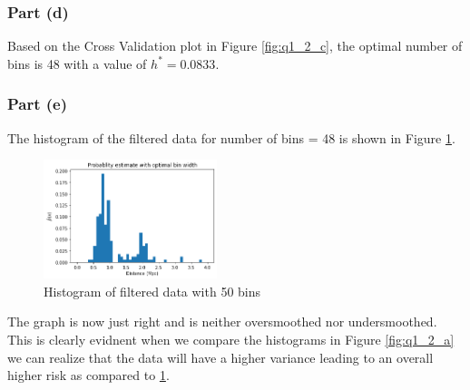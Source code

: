 \subsubsection{Part (d)}

Based on the Cross Validation plot in Figure \ref{fig:q1_2_c}, the optimal number of bins is 48 with a value of $h^\ast = 0.0833$.

\subsubsection{Part (e)}

The histogram of the filtered data for number of bins = 48 is shown in Figure \ref{fig:q1_2_e}.

\begin{figure}[H]
    \centering
    \includegraphics[width=0.45\textwidth]{../q1/images/optimalhistogram.png}
    \caption{Histogram of filtered data with 50 bins}
    \label{fig:q1_2_e}
\end{figure}

\hspace{-16pt}The graph is now just right and is neither oversmoothed nor undersmoothed. This is clearly evidnent when we compare the histograms in Figure \ref{fig:q1_2_a} we can realize that the data will have a higher variance leading to an overall higher risk as compared to \ref{fig:q1_2_e}.
\newpage